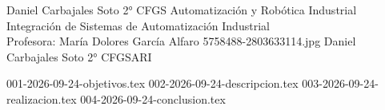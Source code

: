 \documentclass[spanish,openany]{report}
\date{\today}
\begin{document}
{Daniel Carbajales Soto}
{ 2° CFGS Automatización y Robótica Industrial\\
	Integración de Sistemas de Automatización Industrial\\
	Profesora: María Dolores García Alfaro}
{5758488-2803633114.jpg}
\maketoc
{}
{Daniel Carbajales Soto}
{2° CFGSARI}
\setcounter{page}{1}
%





{001-2026-09-24-objetivos.tex}
{002-2026-09-24-descripcion.tex}
{003-2026-09-24-realizacion.tex}
{004-2026-09-24-conclusion.tex}
\end{document}
